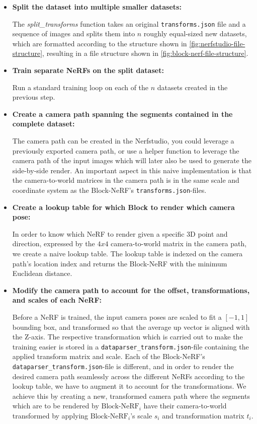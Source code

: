 \begin{itemize}
    \item \textbf{Split the dataset into multiple smaller datasets:} 

    The \textit{split\_transforms} function takes an original \texttt{transforms.json} file and a sequence of images and splits them into $n$ roughly equal-sized new datasets, which are formatted according to the structure shown in \autoref{fig:nerfstudio-file-structure}, resulting in a file structure shown in \autoref{fig:block-nerf-file-structure}.

    \item \textbf{Train separate NeRFs on the split dataset:} 

    Run a standard training loop on each of the $n$ datasets created in the previous step.
    
    \item \textbf{Create a camera path spanning the segments contained in the complete dataset:}
    
    The camera path can be created in the Nerfstudio, you could leverage a previously exported camera path, or use a helper function to leverage the camera path of the input images which will later also be used to generate the side-by-side render. An important aspect in this naive implementation is that the camera-to-world matrices in the camera path is in the same scale and coordinate system as the Block-NeRF's \texttt{transforms.json}-files.
    
    \item \textbf{Create a lookup table for which Block to render which camera pose:}

    In order to know which NeRF to render given a specific 3D point and direction, expressed by the $4x4$ camera-to-world matrix in the camera path, we create a naive lookup table. The lookup table is indexed on the camera path's location index and returns the Block-NeRF with the minimum Euclidean distance.

    \item \textbf{Modify the camera path to account for the offset, transformations, and scales of each NeRF:}
    
    Before a NeRF is trained, the input camera poses are scaled to fit a $[-1, 1]$ bounding box, and transformed so that the average up vector is aligned with the Z-axis. The respective transformation which is carried out to make the training easier is stored in a \texttt{dataparser\_transform.json}-file containing the applied transform matrix and scale. Each of the Block-NeRF's \texttt{dataparser\_transform.json}-file is different, and in order to render the desired camera path seamlessly across the different NeRFs according to the lookup table, we have to augment it to account for the transformations. We achieve this by creating a new, transformed camera path where the segments which are to be rendered by $\text{Block-NeRF}_i$ have their camera-to-world transformed by applying $\text{Block-NeRF}_i$'s scale $s_i$ and transformation matrix $t_i$. 
    

\end{itemize}
